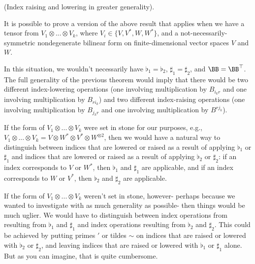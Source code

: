 \begin{remark}
    (Index raising and lowering in greater generality).

    It is possible to prove a version of the above result that applies when we have a tensor from $V_1 \otimes ... \otimes V_k$, where ${V_i \in \{V, V^*, W, W^*\}}$, and a not-necessarily-symmetric nondegenerate bilinear form on finite-dimensional vector spaces $V$ and $W$.
    
    In this situation, we wouldn't necessarily have $\flat_1 = \flat_2$, $\sharp_1 = \sharp_2$, and $\BB = \BB^\top$. The full generality of the previous theorem would imply that there would be two different index-lowering operations (one involving multiplication by $B_{i_k r}$ and one involving multiplication by $B_{r i_k}$) and two different index-raising operations (one involving multiplication by $B_{j_k r}$ and one involving multiplication by $B^{r j_k}$).
    
    If the form of $V_1 \otimes ... \otimes V_k$ were set in stone for our purposes, e.g., $V_1 \otimes ... \otimes V_k = V \otimes W^* \otimes V^* \otimes W^{\otimes 2}$, then we would have a natural way to distinguish between indices that are lowered or raised as a result of applying $\flat_1$ or $\sharp_1$ and indices that are lowered or raised as a result of applying $\flat_2$ or $\sharp_2$: if an index corresponds to $V$ or $W^*$, then $\flat_1$ and $\sharp_1$ are applicable, and if an index corresponds to $W$ or $V^*$, then $\flat_2$ and $\sharp_2$ are applicable.

    If the form of $V_1 \otimes ... \otimes V_k$ weren't set in stone, however- perhaps because we wanted to investigate with as much generality as possible- then things would be much uglier. We would have to distinguish between index operations from resulting from $\flat_1$ and $\sharp_1$ and index operations resulting from $\flat_2$ and $\sharp_2$.    This could be achieved by putting primes $'$ or tildes $\sim$ on indices that are raised or lowered with $\flat_2$ or $\sharp_2$, and leaving indices that are raised or lowered with $\flat_1$ or $\sharp_1$ alone. But as you can imagine, that is quite cumbersome.




\end{remark}
